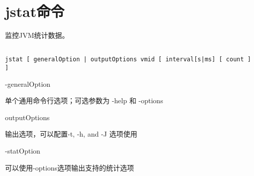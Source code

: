 \section{jstat命令}
\label{chap:tools_jstat}

监控JVM统计数据。


\begin{lstlisting}[language=cshell]

jstat [ generalOption | outputOptions vmid [ interval[s|ms] [ count ] ]

\end{lstlisting}


-generalOption

单个通用命令行选项；可选参数为 -help 和 -options


outputOptions

输出选项，可以配置-t, -h, and -J 选项使用



-statOption

可以使用-options选项输出支持的统计选项


